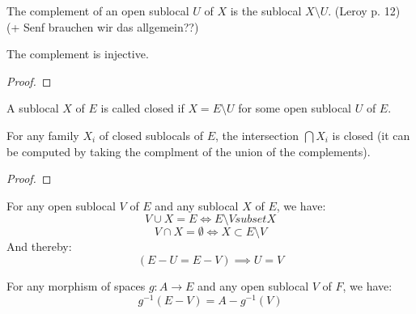 \begin{definition}[Complement]
    \label{def:complement}
    \leanok
    The complement of an open sublocal $U$ of $X$ is the sublocal $X \setminus U$.
    (Leroy p. 12) (+ Senf brauchen wir das allgemein??)
\end{definition}

\begin{lemma}
    \label{lem:complement_injective}
    \leanok
    The complement is injective.
\end{lemma}
\begin{proof}
    \leanok
\end{proof}

\begin{definition}
    \label{def:closed_sublocal}
    \leanok
    A sublocal $X$ of $E$ is called closed if $X = E \setminus U$ for some open sublocal $U$ of $E$.
\end{definition}

\begin{lemma}
    \label{lem:closed_intersection}
    \leanok
    For any family $X_i$ of closed sublocals of $E$, the intersection $\bigcap X_i$ is closed (it can be computed by
    taking the complment of the union of the complements).
\end{lemma}
\begin{proof}
    \leanok
\end{proof}


\begin{lemma}
    \label{lem:properties_of_complements}
    For any open sublocal $V$ of $E$ and any sublocal $X$ of $E$, we have:
    \[V \cup X = E \iff E \setminus V subset X\]
    \[V \cap X = \emptyset \iff X \subset E \setminus V\]
    And thereby:
    \[(E - U = E - V) \implies U = V\]
\end{lemma}

\begin{lemma}
    \label{lem:preimage_of_complements}
    For any morphism of spaces $g: A \to E$ and any open sublocal $V$ of $F$, we have:
    \[g^{-1}(E - V) = A - g^{-1}(V)\]
\end{lemma}

